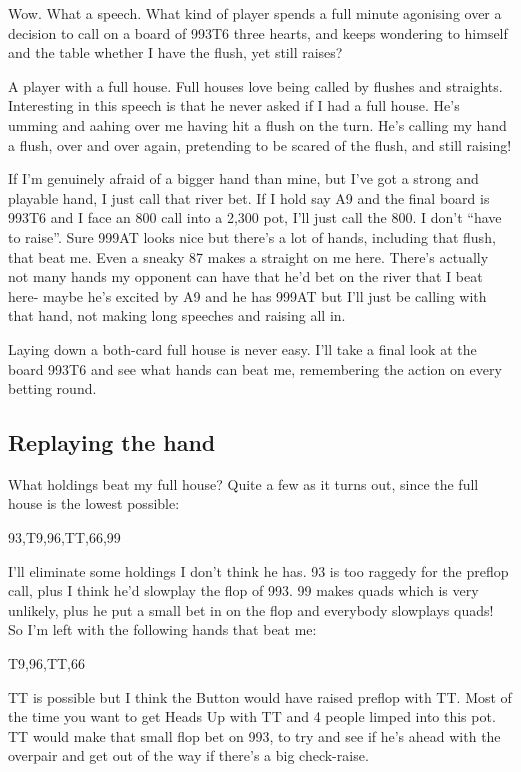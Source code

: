Wow. What a speech. What kind of player spends a full minute agonising
over a decision to call on a board of 993T6 three hearts, and keeps
wondering to himself and the table whether I have the flush, yet still
raises?

A player with a full house. Full houses love being called by flushes
and straights. Interesting in this speech is that he never asked
if I had a full house. He's umming and aahing over me having
hit a flush on the turn. He's calling my hand a flush, over and over
again, pretending to be scared of the flush, and still raising!

If I'm genuinely afraid of a bigger hand than mine, but I've
got a strong and playable hand, I just call that river bet.
If I hold say A9 and the final board is 993T6 and I face an 800 call into
a 2,300 pot, I'll just call the 800. I don't ``have to raise''. Sure 999AT
looks nice but there's a lot of hands, including that flush, that beat me.
Even a sneaky 87 makes a straight on me here. There's actually not many
hands my opponent can have that he'd bet on the river that I beat here- maybe
he's excited by A9 and he has 999AT but I'll just be calling with that hand,
not making long speeches and raising all in.

Laying down a both-card full house is never easy. I'll take a final look
at the board 993T6 and see what hands can beat me, remembering the
action on every betting round.

\subsection{Replaying the hand}

What holdings beat my full house? Quite a few as it turns out, since
the full house is the lowest possible:

93,T9,96,TT,66,99

I'll eliminate some holdings I don't think he has. 93 is too raggedy
for the preflop call, plus I think he'd slowplay the flop of 993.
99 makes quads which is very unlikely, plus he put a small bet in
on the flop and everybody slowplays quads! So I'm left with the following
hands that beat me:

T9,96,TT,66

TT is possible but I think the Button would have raised preflop with TT.
Most of the time you want to get Heads Up with TT and 4 people limped
into this pot. TT would make that small flop bet on 993, to try and see
if he's ahead with the overpair and get out of the way if there's a big
check-raise.

